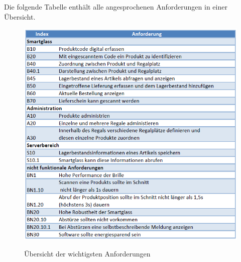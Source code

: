 Die folgende Tabelle enthält alle angesprochenen Anforderungen in einer Übersicht. 
\begin{figure}[H]
	\centering
	{\includegraphics[width=\textwidth]{Bilder/Abbildungen/anforderungen_zusammenfassung.png}}
	\caption{Übersicht der wichtigsten Anforderungen}
	\label{fig:anforderungen_uebers}
\end{figure}
